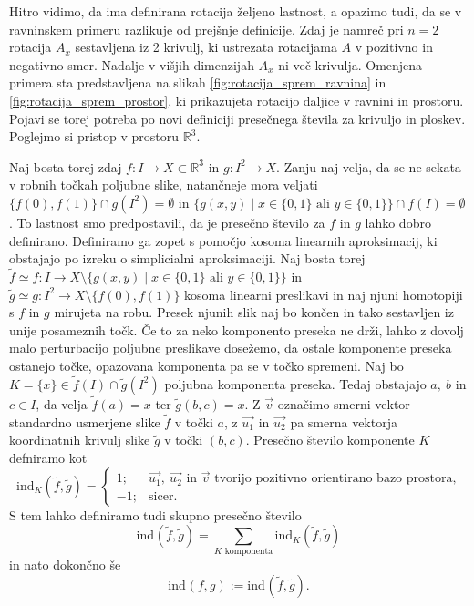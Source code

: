 \documentclass[mat1]{fmfdelo}
\newcommand{\R}{\mathbb R}
\newcommand{\ind}[3][]{\text{ind}_{#1}(#2, #3)}
\begin{document}
Hitro vidimo, da ima definirana rotacija željeno lastnost, a opazimo tudi, da se v ravninskem primeru razlikuje od prejšnje definicije. Zdaj je namreč pri $n=2$ rotacija $A_x$ sestavljena iz 2 krivulj, ki ustrezata rotacijama $A$ v pozitivno in negativno smer. Nadalje v višjih dimenzijah $A_x$ ni več krivulja. Omenjena primera sta predstavljena na slikah \ref{fig:rotacija_sprem_ravnina} in \ref{fig:rotacija_sprem_prostor}, ki prikazujeta rotacijo daljice v ravnini in prostoru. Pojavi se torej potreba po novi definiciji presečnega števila za krivuljo in ploskev. Poglejmo si pristop v prostoru $\R^3$.

Naj bosta torej zdaj $f \colon I \to X \subset \R^3$ in $g \colon I^2 \to X$. Zanju naj velja, da se ne sekata v robnih točkah poljubne slike, natančneje mora veljati $\{f(0), f(1)\} \cap g(I^2) = \emptyset$ in $\{g(x, y) \mid x \in \{0, 1\} \text{ ali } y \in \{0, 1\} \} \cap f(I) = \emptyset$. To lastnost smo predpostavili, da je presečno število za $f$ in $g$ lahko dobro definirano. Definiramo ga zopet s pomočjo kosoma linearnih aproksimacij, ki obstajajo po izreku o simplicialni aproksimaciji. Naj bosta torej $\widetilde{f} \simeq f \colon I \to X \setminus \{g(x, y) \mid x \in \{0, 1\} \text{ ali } y \in \{0, 1\} \}$ in $\widetilde{g} \simeq g\colon I^2 \to X \setminus \{f(0), f(1)\}$ kosoma linearni preslikavi in naj njuni homotopiji s $f$ in $g$ mirujeta na robu. Presek njunih slik naj bo končen in tako sestavljen iz unije posameznih točk. Če to za neko komponento preseka ne drži, lahko z dovolj malo perturbacijo poljubne preslikave dosežemo, da ostale komponente preseka ostanejo točke, opazovana komponenta pa se v točko spremeni. Naj bo $K = \{x\} \in \widetilde{f}(I) \cap \widetilde{g}(I^2)$ poljubna komponenta preseka. Tedaj obstajajo $a,\ b$ in $c \in I$, da velja $\widetilde{f}(a) = x$ ter $\widetilde{g}(b, c) = x$. Z $\overrightarrow{v}$ označimo smerni vektor standardno usmerjene slike $\widetilde{f}$ v točki $a$, z $\overrightarrow{u_1}$ in $\overrightarrow{u_2}$ pa smerna vektorja koordinatnih krivulj slike $\widetilde{g}$ v točki $(b, c)$. Presečno število komponente $K$ defniramo kot
\begin{equation*}
\ind[K]{\widetilde{f}}{\widetilde{g}} = \begin{cases}
1; &\overrightarrow{u_1},\ \overrightarrow{u_2} \text{ in } \overrightarrow{v} \text{ tvorijo pozitivno orientirano bazo prostora,}\\
-1; &\text{sicer}.
\end{cases}
\end{equation*}
S tem lahko definiramo tudi skupno presečno število \[ \ind{\widetilde{f}}{\widetilde{g}} = \sum_{K \text{ komponenta}} \ind[K]{\widetilde{f}}{\widetilde{g}} \] in nato dokončno še \[ \ind{f}{g} := \ind{\widetilde{f}}{\widetilde{g}}. \]
\end{document}
